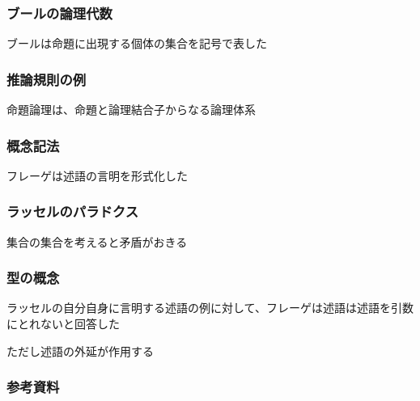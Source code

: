 \documentclass[unicode, 14pt, aspectratio=169]{beamer}
\begin{document}
\begin{frame}
  \frametitle{ブールの論理代数}
  {\large ブールは命題に出現する個体の集合を記号で表した}
\end{frame}
\begin{frame}
  \frametitle{推論規則の例}
  {\large 命題論理は、命題と論理結合子からなる論理体系}
\end{frame}
\begin{frame}
  \frametitle{概念記法}
  {\large フレーゲは述語の言明を形式化した}
\end{frame}
\begin{frame}
  \frametitle{ラッセルのパラドクス}
  {\large 集合の集合を考えると矛盾がおきる}
\end{frame}
\begin{frame}
  \frametitle{型の概念}
  ラッセルの自分自身に言明する述語の例に対して、フレーゲは述語は述語を引数にとれないと回答した

  ただし述語の外延が作用する
\end{frame}
\begin{frame}[allowframebreaks,t]
  \frametitle{参考資料}
  \printbibliography
  \nocite{*}
\end{frame}
\end{document}
